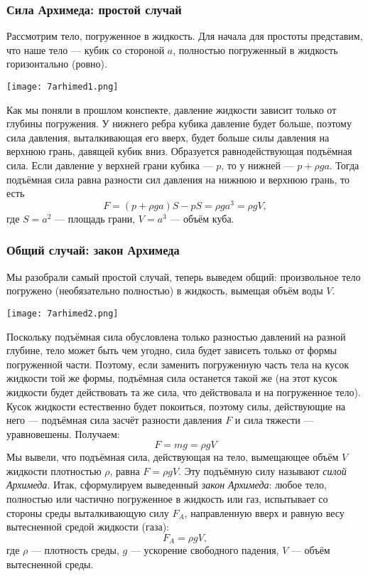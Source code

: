 \documentclass[12pt, a4paper]{article}%
\begin{document}
\subsubsection*{Сила Архимеда: простой случай}

Рассмотрим тело, погруженное в жидкость. Для начала для простоты представим, что наше тело --- кубик со стороной $a$,
полностью погруженный в жидкость горизонтально (ровно).


\begin{center}
\texttt{[image: 7arhimed1.png]}
\label{fig:mpr}
\end{center}

Как мы поняли в прошлом конспекте, давление жидкости зависит только от глубины погружения. 
У нижнего ребра кубика давление будет больше, поэтому сила давления, выталкивающая его вверх, будет больше силы давления на верхнюю грань, давящей кубик вниз. Образуется равнодействующая подъёмная сила. Если давление у верхней грани кубика --- $p$, то у нижней --- $p+\rho ga$. Тогда подъёмная сила равна разности сил давления на нижнюю и верхнюю грань, то есть
\[
F = (p+\rho ga)S - pS = \rho ga^3 = \rho gV,
\]
где $S = a^2$ --- площадь грани, $V = a^3$ --- объём куба.


\subsubsection*{Общий случай: закон Архимеда}

Мы разобрали самый простой случай,
теперь выведем общий: произвольное тело погружено (необязательно полностью) в жидкость, вымещая объём воды $V$. 



\begin{center}
\texttt{[image: 7arhimed2.png]}
\label{fig:mpr}
\end{center}

Поскольку подъёмная сила обусловлена только разностью давлений на разной глубине, тело может быть чем угодно, сила будет зависеть только от формы погруженной части. Поэтому, если заменить погруженную часть тела на 
кусок жидкости той же формы, подъёмная сила останется такой же (на этот кусок жидкости будет действовать та же сила, что действовала и на погруженное тело). Кусок жидкости естественно будет покоиться, поэтому силы,
действующие на него ---  подъёмная сила засчёт разности давления $F$ и сила тяжести --- уравновешены. Получаем:
\[
F = mg = \rho gV
\]
Мы вывели, что подъёмная сила, действующая на тело, вымещающее объём $V$ жидкости плотностью $\rho$, равна $F = \rho g V$. Эту подъёмную силу называют \textit{силой Архимеда}. Итак, сформулируем выведенный \textit{закон Архимеда}: любое тело, полностью или частично погруженное в жидкость или газ, испытывает со стороны среды выталкивающую силу \(F_A\), направленную вверх и равную весу вытесненной средой жидкости (газа): 
\[
F_A = \rho gV,
\]
где \(\rho\) — плотность среды, \(g\) — ускорение свободного падения, \(V\) — объём вытесненной среды.
\end{document}
